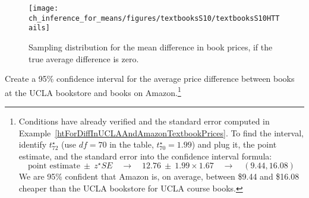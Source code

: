\begin{figure}[h]
\centering
\texttt{[image: ch\_inference\_for\_means/figures/textbooksS10/textbooksS10HTTails]}
\caption{Sampling distribution for the mean difference in book prices, if the true average difference is zero.}
\label{textbooksS10HTTails}
\end{figure}

\begin{exercise}
Create a 95\% confidence interval for the average price difference between books at the UCLA bookstore and books on Amazon.\footnote{Conditions have already verified and the standard error computed in Example~\ref{htForDiffInUCLAAndAmazonTextbookPrices}. To find the interval, identify $t^{\star}_{72}$ (use $df=70$ in the table, $t^{\star}_{70} = 1.99$) and plug it, the point estimate, and the standard error into the confidence interval formula:
$$\text{point estimate} \ \pm\ z^{\star}SE \quad\to\quad 12.76 \ \pm\ 1.99\times 1.67 \quad\to\quad (9.44, 16.08)$$
We are 95\% confident that Amazon is, on average, between \$9.44 and \$16.08 cheaper than the UCLA bookstore for UCLA course books.}


\end{exercise}






